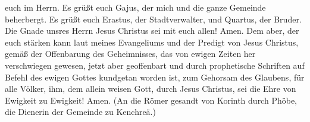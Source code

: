 euch im Herrn.  Es grüßt euch Gajus, der mich und die
ganze Gemeinde beherbergt. Es grüßt euch Erastus, der Stadtverwalter,
und Quartus, der Bruder.  Die Gnade unsres Herrn Jesus
Christus sei mit euch allen! Amen.  Dem aber, der euch
stärken kann laut meines Evangeliums und der Predigt von Jesus Christus,
gemäß der Offenbarung des Geheimnisses, das von ewigen Zeiten her
verschwiegen gewesen,  jetzt aber geoffenbart und durch
prophetische Schriften auf Befehl des ewigen Gottes kundgetan worden
ist, zum Gehorsam des Glaubens, für alle Völker,  ihm,
dem allein weisen Gott, durch Jesus Christus, sei die Ehre von Ewigkeit
zu Ewigkeit! Amen. (An die Römer gesandt von Korinth durch Phöbe, die
Dienerin der Gemeinde zu Kenchreä.)
